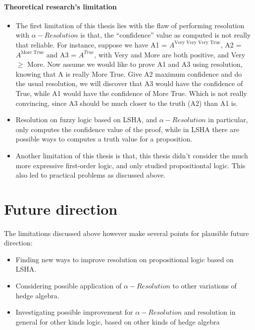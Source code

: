\documentclass[../gr-final.tex]{subfiles}
\begin{document}
\paragraph{Theoretical research's limitation}
\begin{itemize}
        \item The first limitation of this thesis lies with the flaw 
                of performing resolution with
                $\alpha-Resolution$ is that, the ``confidence''
                value as computed is not really that reliable.
                For instance, suppose we have A1 = $A^{\text{Very
                Very Very True}}$,
                A2 = $A^{\text{More True}}$ and A3 = $A^{True}$, with Very
                and More are both positive, and Very $\ge$ More.
                Now assume we would like to prove A1 and A3 using
                resolution, 
                knowing that A is really More True. Give A2
                maximum confidence and do the usual resolution,
                we will discover that A3 would have the
                confidence of True, while A1 would have the
                confidence of More True. Which is not really
                convincing, since A3 should be much closer to the
                truth (A2) than A1 is.
        \item Resolution on fuzzy logic based on LSHA, and $\alpha-Resolution$ 
                in particular, only computes the confidence value
                of the proof, while in LSHA there are possible
                ways to computes a truth value for a
                proposition.
        \item Another limitation of this thesis is that, this
                thesis didn't consider the much more expressive
                first-order logic, and only studied
                propositiontal logic. This also led to practical
                problems as discussed above.
\end{itemize}
\section{Future direction}
\paragraph{} The limitations discussed above however make several
points for plausible future direction:
\begin{itemize}
        \item Finding new ways to improve resolution on
                propositional logic based on LSHA. 
        \item Considering possible application of
                $\alpha-Resolution$ to other variations of hedge
                algebra.
        \item Investigating possible improvement for
                $\alpha-Resolution$ and resolution in general for
                other kinds logic, based on other kinds of hedge
                algebra               
\end{itemize}
\end{document}
